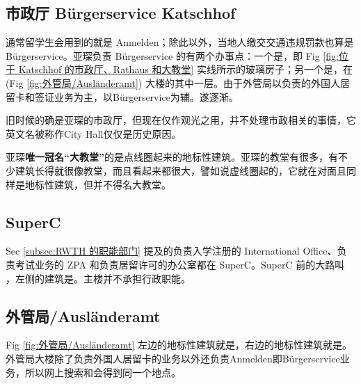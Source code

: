   \subsection{市政厅 Bürgerservice Katschhof}\label{subsec:市政厅 Bürgerservice Katschhof}

    通常留学生会用到的就是 Anmelden；除此以外，当地人缴交交通违规罚款也算是 Bürgerservice。亚琛负责 Bürgerservice 的有两个办事点：一个是，即 Fig \ref{fig:位于 Katschhof 的市政厅、Rathaus 和大教堂} 实线所示的玻璃房子；另一个是，在 (Fig \ref{fig:外管局/Ausländeramt}) 大楼的其中一层。由于外管局以负责的外国人居留卡和签证业务为主，以Bürgerservice为辅。遂逐渐。

    旧时候的确是亚琛的市政厅，但现在仅作观光之用，并不处理市政相关的事情，它英文名被称作City Hall仅仅是历史原因。

    亚琛\textbf{唯一冠名``大教堂''}的是点线圈起来的地标性建筑。亚琛的教堂有很多，有不少建筑长得就很像教堂，而且看起来都很大，譬如说虚线圈起的，它就在对面且同样是地标性建筑，但并不得名大教堂。

  \subsection{SuperC}\label{subsec:SuperC}

    Sec \ref{subsec:RWTH 的职能部门} 提及的负责入学注册的 International Office、负责考试业务的 ZPA 和负责居留许可的办公室都在 SuperC。SuperC 前的大路叫 ，左侧的建筑是。主楼并不承担行政职能。

  \subsection{外管局/Ausländeramt}\label{subsec:外管局}

    Fig \ref{fig:外管局/Ausländeramt} 左边的地标性建筑就是，右边的地标性建筑就是。外管局大楼除了负责外国人居留卡的业务以外还负责Anmelden即Bürgerservice业务，所以网上搜索和会得到同一个地点。

